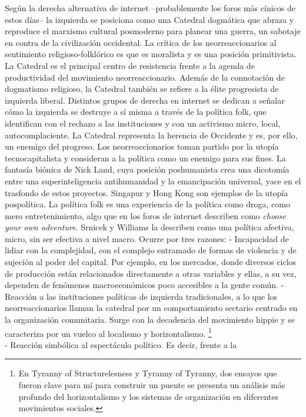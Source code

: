 \documentclass[
]{article}
\begin{document}
Según la derecha alternativa de internet --probablemente los foros más
cínicos de estos días-- la izquierda se posiciona como una Catedral
dogmática que abraza y reproduce el marxismo cultural posmoderno para
planear una guerra, un sabotaje en contra de la civilización occidental.
La crítica de los neorreaccionarios al sentimiento religioso-folklórico
es que es moralista y es una posición primitivista. La Catedral es el
principal centro de resistencia frente a la agenda de productividad del
movimiento neorreaccionario. Además de la connotación de dogmatismo
religioso, la Catedral también se refiere a la élite progresista de
izquierda liberal. Distintos grupos de derecha en internet se dedican a
señalar cómo la izquierda se destruye a sí misma a través de la política
folk, que identifican con el rechazo a las instituciones y con un
activismo micro, local, autocomplaciente. La Catedral representa la
herencia de Occidente y es, por ello, un enemigo del progreso. Los
neorreaccionarios toman partido por la utopía tecnocapitalista y
consideran a la política como un enemigo para sus fines. La fantasía
biónica de Nick Land, cuya posición poshumanista crea una dicotomía
entre una superinteligencia antihumanidad y la emancipación universal,
yace en el trasfondo de estos proyectos. Singapur y Hong Kong son
ejemplos de la utopía pospolítica. La política folk es una experiencia
de la política como droga, como mero entretenimiento, algo que en los
foros de internet describen como \emph{choose your own adventure}.
Srnicek y Williams la describen como una política afectiva, micro, sin
ser efectiva a nivel macro. Ocurre por tres razones: - Incapacidad de
lidiar con la complejidad, con el complejo entramado de formas de
violencia y de sujeción al poder del capital. Por ejemplo, en los
mercados, donde diversos ciclos de producción están relacionados
directamente a otras variables y ellas, a su vez, dependen de fenómenos
macroeconómicos poco accesibles a la gente común. - Reacción a las
instituciones políticas de izquierda tradicionales, a lo que los
neorreaccionarios llaman la catedral por un comportamiento sectario
centrado en la organización comunitaria. Surge con la decadencia del
movimiento hippie y se caracteriza por un vuelco al localismo y
horizontalismo. \footnote{En Tyranny of Structurelesness y Tyranny of
  Tyranny, dos ensayos que fueron clave para mí para construir un puente
  se presenta un análisis más profundo del horizontalismo y los sistemas
  de organización en diferentes movimientos sociales.}\\
- Reacción simbólica al espectáculo político. Es decir, frente a la
\end{document}
